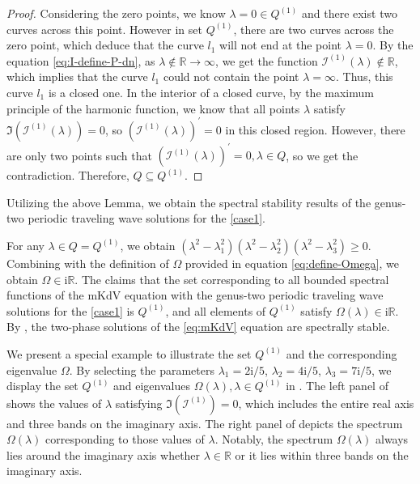 \documentclass[11pt,reqno]{amsart}
\newcommand{\ii}{\mathrm{i}}
\numberwithin{equation}{section}
\begin{document}
\begin{proof}
	Considering the zero points, we know $\lambda=0\in  Q^{(1)} $ and there exist two curves across this point.
	However in set $ Q^{(1)} $, there are two curves across the zero point, which deduce that the curve $l_1$ will not end at the point $\lambda=0$.
	By the equation \eqref{eq:I-define-P-dn}, as $\lambda \not \in \mathbb{R}\rightarrow \infty$, we get the function $\mathcal{I}^{(1)}(\lambda) \not \in \mathbb{R}$, which implies that the curve $l_1$ could not contain the point $\lambda =\infty$.
	Thus, this curve $l_1$ is a closed one. In the interior of a closed curve, by the maximum principle of the harmonic function, we know that all points $\lambda$ satisfy ${\Im}(\mathcal{I}^{(1)}(\lambda))=0$, so $(\mathcal{I}^{(1)}(\lambda))^{\prime}=0$ in this closed region. However, there are only two points such that $(\mathcal{I}^{(1)}(\lambda))^{\prime}=0, \lambda\in Q$, so we get the contradiction. Therefore, $Q \subseteq  Q^{(1)} $.
\end{proof}

Utilizing the above Lemma, we obtain the spectral stability results of the genus-two periodic traveling wave solutions  for the \ref{case1}.


\newenvironment{proof-spec-dn}{\emph{Proof of \Cref{theorem:spectral-image}.}}{\hfill$\Box$\medskip}
\begin{proof-spec-dn}
	For any $\lambda \in Q= Q^{(1)} $, we obtain $ (\lambda^2-\lambda_1^2)(\lambda^2-\lambda_2^2)(\lambda^2-\lambda_3^2)\ge 0$.
	Combining with the definition of $\Omega$ provided in equation \eqref{eq:define-Omega}, we obtain $\Omega\in \ii \mathbb{R}$. 
	The  claims that the set corresponding to all bounded spectral functions of the mKdV equation with the genus-two periodic traveling wave solutions  for the \ref{case1} is $ Q^{(1)} $, and all elements of $ Q^{(1)} $ satisfy $\Omega(\lambda) \in \ii \mathbb{R}$. 
	By , the two-phase solutions of the \ref{eq:mKdV} equation are spectrally stable. 
\end{proof-spec-dn}

We present a special example to illustrate the set $Q^{(1)}$ and the corresponding eigenvalue $\Omega$.
By selecting the parameters  $\lambda_1=2\ii/5$, $\lambda_2=4\ii /5$, $\lambda_3=7\ii/5$, we display the set  $Q^{(1)}$ and eigenvalues $\Omega(\lambda),\lambda\in Q^{(1)}$ in .
The left panel of  shows the values of  $\lambda$ satisfying $\Im(\mathcal{I}^{(1)})=0$, which includes the entire real axis and three bands on the imaginary axis.
The right panel of   depicts the spectrum $\Omega(\lambda)$ corresponding to those values of  $\lambda$. Notably,  the spectrum $\Omega(\lambda)$ always lies around the imaginary axis whether  $\lambda\in \mathbb{R}$ or it lies within three bands on the imaginary axis.
\end{document}

